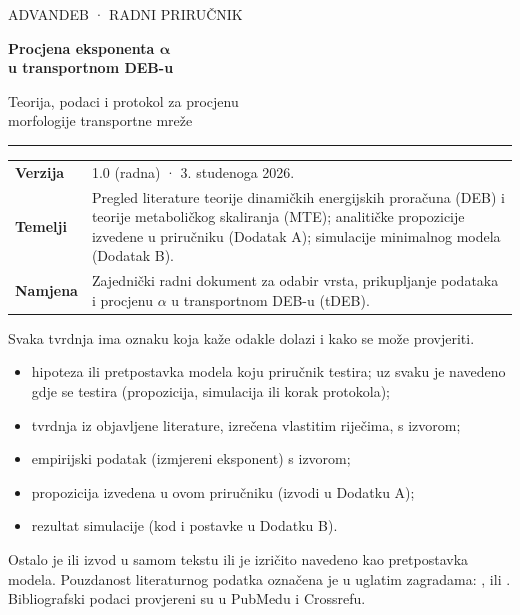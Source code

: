 \begin{titlepage}
\thispagestyle{empty}
\vspace*{1.2cm}
{\sffamily\small\color{akcent}\MakeUppercase{AdvanDEB · radni priručnik}}\par
\vspace{0.6cm}
{\sffamily\bfseries\fontsize{28}{33}\selectfont\color{akcent} Procjena eksponenta $\boldsymbol{\alpha}$\\[2pt] u transportnom DEB-u\par}
\vspace{0.5cm}
{\Large Teorija, podaci i protokol za procjenu\\ morfologije transportne mreže\par}
\vspace{0.9cm}
{\color{siva}\rule{\linewidth}{0.5pt}}
\vspace{0.3cm}

\begin{tabularx}{\linewidth}{@{}lX@{}}
\textbf{Verzija} & 1.0 (radna) · 3. studenoga 2026. \\
\textbf{Temelji} & Pregled literature teorije dinamičkih energijskih proračuna (DEB) i teorije metaboličkog skaliranja (MTE); analitičke propozicije izvedene u priručniku (Dodatak A); simulacije minimalnog modela (Dodatak B). \\
\textbf{Namjena} & Zajednički radni dokument za odabir vrsta, prikupljanje podataka i procjenu $\alpha$ u transportnom DEB-u (tDEB). \\
\end{tabularx}

\vspace{0.6cm}
\begin{kljucno}
Svaka tvrdnja ima oznaku koja kaže odakle dolazi i kako se može provjeriti.
\begin{itemize}[leftmargin=4.2em,labelwidth=3.4em,align=left]
\item[\textbf{H}] hipoteza ili pretpostavka modela koju priručnik testira; uz svaku je navedeno gdje se testira (propozicija, simulacija ili korak protokola);
\item[\textbf{T}] tvrdnja iz objavljene literature, izrečena vlastitim riječima, s izvorom;
\item[\textbf{E}] empirijski podatak (izmjereni eksponent) s izvorom;
\item[\textbf{P}] propozicija izvedena u ovom priručniku (izvodi u Dodatku A);
\item[\textbf{S}] rezultat simulacije (kod i postavke u Dodatku B).
\end{itemize}
Ostalo je ili izvod u samom tekstu ili je izričito navedeno kao pretpostavka modela. Pouzdanost literaturnog podatka označena je u uglatim zagradama: ,  ili . Bibliografski podaci provjereni su u PubMedu i Crossrefu.
\end{kljucno}


\end{titlepage}

